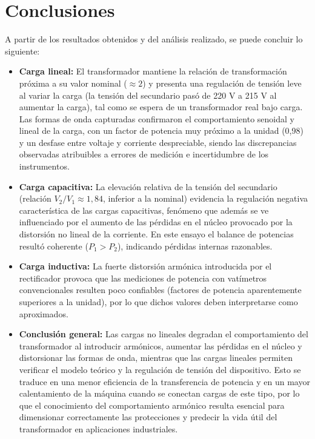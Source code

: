 \section{Conclusiones}

A partir de los resultados obtenidos y del análisis realizado, se puede concluir lo siguiente:

\begin{itemize}
    \item \textbf{Carga lineal:} El transformador mantiene la relación de transformación próxima a su valor nominal ($\approx 2$) y presenta una regulación de tensión leve al variar la carga (la tensión del secundario pasó de 220 V a 215 V al aumentar la carga), tal como se espera de un transformador real bajo carga. Las formas de onda capturadas confirmaron el comportamiento senoidal y lineal de la carga, con un factor de potencia muy próximo a la unidad (0,98) y un desfase entre voltaje y corriente despreciable, siendo las discrepancias observadas atribuibles a errores de medición e incertidumbre de los instrumentos.

    \item \textbf{Carga capacitiva:} La elevación relativa de la tensión del secundario (relación $V_2/V_1 \approx 1,84$, inferior a la nominal) evidencia la regulación negativa característica de las cargas capacitivas, fenómeno que además se ve influenciado por el aumento de las pérdidas en el núcleo provocado por la distorsión no lineal de la corriente. En este ensayo el balance de potencias resultó coherente ($P_1 > P_2$), indicando pérdidas internas razonables.

    \item \textbf{Carga inductiva:} La fuerte distorsión armónica introducida por el rectificador provoca que las mediciones de potencia con vatímetros convencionales resulten poco confiables (factores de potencia aparentemente superiores a la unidad), por lo que dichos valores deben interpretarse como aproximados.

    \item \textbf{Conclusión general:} Las cargas no lineales degradan el comportamiento del transformador al introducir armónicos, aumentar las pérdidas en el núcleo y distorsionar las formas de onda, mientras que las cargas lineales permiten verificar el modelo teórico y la regulación de tensión del dispositivo. Esto se traduce en una menor eficiencia de la transferencia de potencia y en un mayor calentamiento de la máquina cuando se conectan cargas de este tipo, por lo que el conocimiento del comportamiento armónico resulta esencial para dimensionar correctamente las protecciones y predecir la vida útil del transformador en aplicaciones industriales.
\end{itemize}